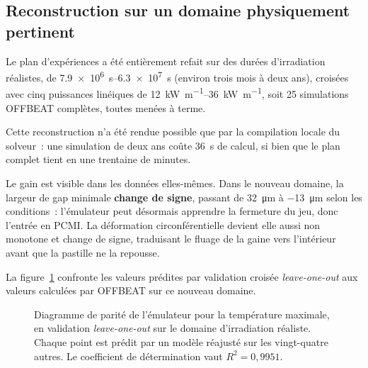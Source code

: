 \documentclass[12pt,a4paper,french]{report}
\begin{document}
\subsection{Reconstruction sur un domaine physiquement pertinent}

Le plan d'expériences a été entièrement refait sur des durées d'irradiation
réalistes, de \SIrange{7.9e6}{6.3e7}{\second} (environ trois mois à deux ans),
croisées avec cinq puissances linéiques de \SIrange{12}{36}{\kilo\watt\per\metre},
soit \num{25} simulations OFFBEAT complètes, toutes menées à terme.

Cette reconstruction n'a été rendue possible que par la compilation locale du
solveur~: une simulation de deux ans coûte \SI{36}{\second} de calcul, si bien
que le plan complet tient en une trentaine de minutes.

Le gain est visible dans les données elles-mêmes. Dans le nouveau domaine, la
largeur de gap minimale \textbf{change de signe}, passant de
\SI{+32}{\micro\metre} à \SI{-13}{\micro\metre} selon les conditions~:
l'émulateur peut désormais apprendre la fermeture du jeu, donc l'entrée en
PCMI. La déformation circonférentielle devient elle aussi non monotone et
change de signe, traduisant le fluage de la gaine vers l'intérieur avant que la
pastille ne la repousse.

La figure~\ref{fig:parite} confronte les valeurs prédites par validation
croisée \textit{leave-one-out} aux valeurs calculées par OFFBEAT sur ce nouveau
domaine.

\begin{figure}[htbp]
\centering
{}
\caption[Diagramme de parité de l'émulateur]{Diagramme de parité de l'émulateur pour la température maximale, en
validation \textit{leave-one-out} sur le domaine d'irradiation réaliste. Chaque
point est prédit par un modèle réajusté sur les vingt-quatre autres.
Le coefficient de détermination vaut $R^2 = 0{,}9951$.}
\label{fig:parite}
\end{figure}
\end{document}
